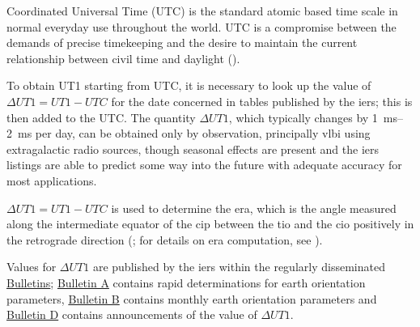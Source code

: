 Coordinated Universal Time (UTC) is the standard atomic based time scale in normal 
everyday use throughout the world. UTC is a compromise between the demands of 
precise timekeeping and the desire to maintain the current relationship between 
civil time and daylight (\cite{sofa_18161_tscb}).

To obtain UT1 starting from UTC, it is necessary to look up the value of 
\( \Delta UT1 = UT1 - UTC \) for the date concerned in tables published by the 
\gls{iers}; this is then added to the UTC. The quantity \(\Delta UT1\), which 
typically changes by \SIrange{1}{2}{\milli\second} per day, can be obtained only 
by observation, principally \gls{vlbi} using extragalactic radio sources, though seasonal effects 
are present and the \gls{iers} listings are able to predict some way into the future 
with adequate accuracy for most applications.

\( \Delta UT1 = UT1 - UTC \) is used to determine the \gls{era}, which is the 
angle measured along the intermediate equator of the \gls{cip} between the \gls{tio} and the 
\gls{cio} positively in the retrograde direction (\cite{IersBulABC04}; for details on 
\gls{era} computation, see \cite{iers2010}).

Values for \( \Delta UT1 \) are published by the \gls{iers} within the regularly disseminated 
\href{https://www.iers.org/IERS/EN/Publications/Bulletins/bulletins.html}{Bulletins}; 
\href{https://datacenter.iers.org/productMetadata.php?id=6}{Bulletin A} contains 
rapid determinations for earth orientation parameters, 
\href{https://datacenter.iers.org/productMetadata.php?id=207}{Bulletin B} 
contains monthly earth orientation parameters and 
\href{https://datacenter.iers.org/productMetadata.php?id=17}{Bulletin D} contains 
announcements of the value of \( \Delta UT1 \).
